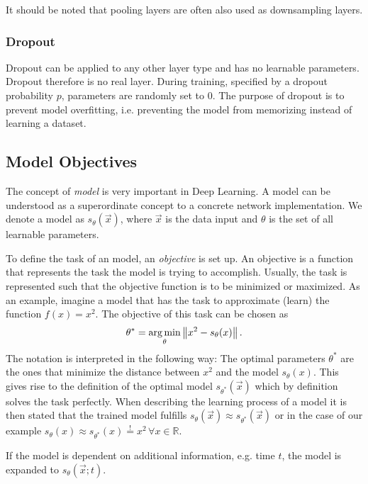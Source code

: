 It should be noted that pooling layers are often also used as downsampling layers.
%
\subsubsection{Dropout }
Dropout can be applied to any other layer type and has no learnable parameters. Dropout therefore is no real layer. During training, specified by a dropout probability $p$, parameters are randomly set to $0$. The purpose of dropout is to prevent model overfitting, i.e. preventing the model from memorizing instead of learning a dataset.
%
\subsection{Model Objectives}
The concept of \textit{model} is very important in Deep Learning. A model can be understood as a superordinate concept to a concrete network implementation. We denote a model as $s_\theta(\vec{x})$, where $\vec{x}$ is the data input and $\theta$ is the set of all learnable parameters.

To define the task of an model, an \textit{objective} is set up. An objective is a function that represents the task the model is trying to accomplish. Usually, the task is represented such that the objective function is to be minimized or maximized. As an example, imagine a model that has the task to approximate (learn) the function $f(x)=x^2$. The objective of this task can be chosen as
%
\begin{equation} 
    \theta^*=\underset{\theta}{\arg \min}\left\lVert x^2-s_\theta(x)\right\rVert.
\end{equation}
%
The notation is interpreted in the following way: The optimal parameters $\theta^*$ are the ones that minimize the distance between $x^2$ and the model $s_\theta(x)$. This gives rise to the definition of the optimal model $s_{\theta^*}(\vec{x})$ which by definition solves the task perfectly. When describing the learning process of a model it is then stated that the trained model fulfills $s_\theta(\vec{x})\approx s_{\theta^*}(\vec{x})$ or in the case of our example $s_\theta(x)\approx s_{\theta^*}(x)\overset{!}{=}x^2\,\forall x\in\mathbb{R}$.

If the model is dependent on additional information, e.g. time $t$, the model is expanded to $s_\theta(\vec{x}; t)$. 
%
